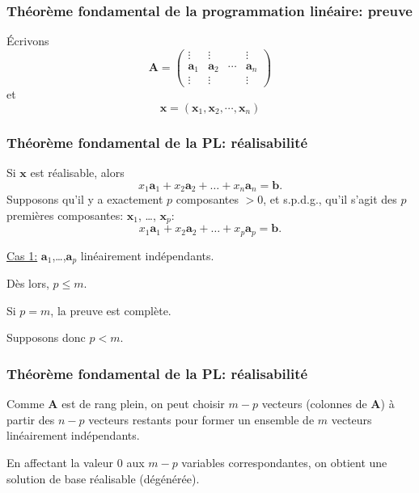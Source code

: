 \documentclass[usepdftitle=false]{beamer}
\def\ba{\boldsymbol{a}}
\def\bb{\boldsymbol{b}}
\def\bx{\boldsymbol{x}}
\def\bA{\boldsymbol{A}}
\begin{document}
\begin{frame}
\frametitle{Théorème fondamental de la programmation linéaire: preuve}

Écrivons
\[
\bA =
\begin{pmatrix}
\vdots & \vdots & & \vdots \\
\ba_1 & \ba_2 & \cdots & \ba_n \\
\vdots & \vdots & & \vdots
\end{pmatrix}
\]
et
\[
\bx = ( \bx_1, \bx_2, \cdots, \bx_n )
\]
\end{frame}

\begin{frame}
\frametitle{Théorème fondamental de la PL: réalisabilité}

Si $\bx$ est réalisable, alors
\[
x_1 \ba_1 + x_2 \ba_2 + \ldots + x_n \ba_n = \bb.
\]
Supposons qu'il y a exactement $p$ composantes $> 0$, et s.p.d.g., qu'il s'agit des $p$ premières composantes: $\bx_1$, \ldots, $\bx_p$:
\[
x_1 \ba_1 + x_2 \ba_2 + \ldots + x_p \ba_p = \bb.
\]

\mbox{}

\underline{Cas 1:} $\ba_1$,\ldots,$\ba_p$ linéairement indépendants.

Dès lors, $p \leq m$.

Si $p = m$, la preuve est complète.

Supposons donc $p < m$.
\end{frame}

\begin{frame}
\frametitle{Théorème fondamental de la PL: réalisabilité}

Comme $\bA$ est de rang plein, on peut choisir $m-p$ vecteurs (colonnes de $\bA$) à partir des $n-p$ vecteurs restants pour former un ensemble de $m$ vecteurs linéairement indépendants.

\mbox{}

En affectant la valeur 0 aux $m-p$ variables correspondantes, on obtient une solution de base réalisable (dégénérée). 
\end{frame}
\end{document}
